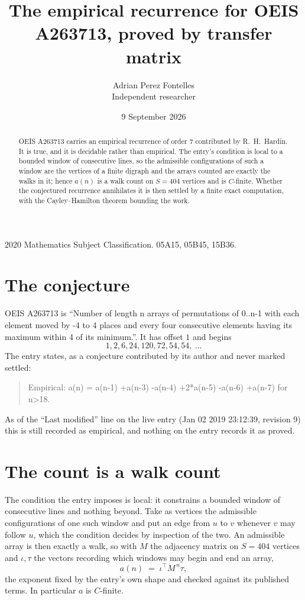 \documentclass[11pt,a4paper]{article}
\title{The empirical recurrence for OEIS A263713, proved by transfer matrix}
\author{Adrian Perez Fontelles\\ \small Independent researcher}
\date{9 September 2026}
\theoremstyle{plain}
\theoremstyle{definition}
\begin{document}
\maketitle

\begin{abstract}
OEIS A263713 carries an empirical recurrence of order $7$ contributed by R.~H.~Hardin. It is
true, and it is decidable rather than empirical. The entry's condition is local to a bounded window of consecutive lines, so
the admissible configurations of such a window are the vertices of a finite digraph and the
arrays counted are exactly the walks in it; hence $a(n)$ is a walk count on $S=404$ vertices
and is $C$-finite. Whether the conjectured recurrence annihilates it is then settled by a
finite exact computation, with the Cayley--Hamilton theorem bounding the work.
\end{abstract}

\noindent\small 2020 Mathematics Subject Classification. 05A15, 05B45, 15B36.\normalsize

\section{The conjecture}

OEIS A263713 is ``Number of length n arrays of permutations of 0..n-1 with each element moved by -4 to 4 places and every four consecutive elements having its maximum within 4 of its minimum.''. It has offset $1$ and begins
\[
1, 2, 6, 24, 120, 72, 54, 54,\ \dots
\]
The entry states, as a conjecture contributed by its author and never marked settled:
\begin{quote}
Empirical: a(n) = a(n-1) +a(n-3) -a(n-4) +2*a(n-5) -a(n-6) +a(n-7) for n>18.
\end{quote}
As of the ``Last modified'' line on the live entry (Jan 02 2019 23:12:39, revision 9) this is still
recorded as empirical, and nothing on the entry records it as proved.

\section{The count is a walk count}

The condition the entry imposes is local: it constrains a bounded window of consecutive lines and nothing beyond. Take as
vertices the admissible configurations of one such window and put an edge from $u$ to $v$
whenever $v$ may follow $u$, which the condition decides by inspection of the two. An
admissible array is then exactly a walk, so with $M$ the adjacency matrix on $S=404$ vertices
and $\iota,\tau$ the vectors recording which windows may begin and end an array,
\[
a(n)\;=\;\iota^{\!\top}M^{\,n}\tau ,
\]
the exponent fixed by the entry's own shape and checked against its published terms. In
particular $a$ is $C$-finite.
\end{document}
